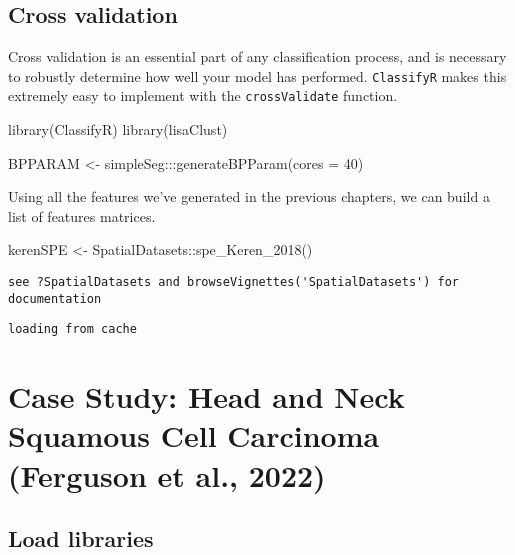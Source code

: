 \documentclass[
  letterpaper,
  DIV=11,
  numbers=noendperiod]{scrreprt}
\newenvironment{Shaded}{\begin{snugshade}}{\end{snugshade}}
\newcommand{\AttributeTok}[1]{\textcolor[rgb]{0.40,0.45,0.13}{#1}}
\newcommand{\DecValTok}[1]{\textcolor[rgb]{0.68,0.00,0.00}{#1}}
\newcommand{\FunctionTok}[1]{\textcolor[rgb]{0.28,0.35,0.67}{#1}}
\newcommand{\NormalTok}[1]{\textcolor[rgb]{0.00,0.23,0.31}{#1}}
\newcommand{\OtherTok}[1]{\textcolor[rgb]{0.00,0.23,0.31}{#1}}
\newcommand{\SpecialCharTok}[1]{\textcolor[rgb]{0.37,0.37,0.37}{#1}}
\begin{document}
\section{Cross validation}\label{cross-validation}

Cross validation is an essential part of any classification process, and
is necessary to robustly determine how well your model has performed.
\texttt{ClassifyR} makes this extremely easy to implement with the
\texttt{crossValidate} function.

\begin{Shaded}
\begin{Highlighting}[]
\FunctionTok{library}\NormalTok{(ClassifyR)}
\FunctionTok{library}\NormalTok{(lisaClust)}

\NormalTok{BPPARAM }\OtherTok{\textless{}{-}}\NormalTok{ simpleSeg}\SpecialCharTok{:::}\FunctionTok{generateBPParam}\NormalTok{(}\AttributeTok{cores =} \DecValTok{40}\NormalTok{)}
\end{Highlighting}
\end{Shaded}

Using all the features we've generated in the previous chapters, we can
build a list of features matrices.

\begin{Shaded}
\begin{Highlighting}[]
\NormalTok{kerenSPE }\OtherTok{\textless{}{-}}\NormalTok{ SpatialDatasets}\SpecialCharTok{::}\FunctionTok{spe\_Keren\_2018}\NormalTok{()}
\end{Highlighting}
\end{Shaded}

\begin{verbatim}
see ?SpatialDatasets and browseVignettes('SpatialDatasets') for documentation
\end{verbatim}

\begin{verbatim}
loading from cache
\end{verbatim}


\chapter{Case Study: Head and Neck Squamous Cell Carcinoma (Ferguson et
al.,
2022)}\label{case-study-head-and-neck-squamous-cell-carcinoma-ferguson-et-al.-2022}

\section{Load libraries}\label{load-libraries}
\end{document}
